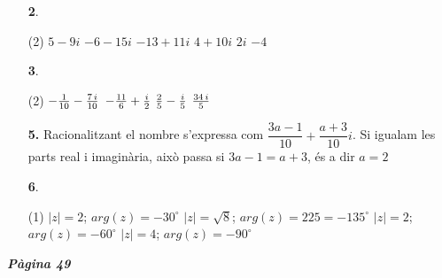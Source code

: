 \documentclass[a4paper, pdf, twoside]{book}
\begin{document}
\begin{multicols}{2}
\begin{enumerate}

 \item[\fontfamily{phv}\selectfont\color{blue}\textbf{2}. ]  \scalebox{0.6}{\simbolclau } 
 \begin{tasks}[column-sep=1em, item-indent=1.3333em](2)
	 \task  $5 -9i$
	 \task $-6-15i$
	 \task $-13+11i$
	 \task $4 + 10i$
	 \task $2i$
	 \task $-4$
\end{tasks}
 \end{enumerate}
\begin{enumerate}
\vspace{0.25cm}



 \item[\fontfamily{phv}\selectfont\color{blue}\textbf{3}. ]  \scalebox{0.6}{\simbolclau } 
 \begin{tasks}[column-sep=1em, item-indent=1.3333em](2)
	 \task*  $-{{1}\over {10}}-{{7\,i}\over {10}}$
	 \task* $-{{11}\over {6}}+{{i}\over {2}}$
	 \task* ${{2}\over {5}}-{{i}\over {5}}$
	 \task ${{34\,i}\over {5}}$
\end{tasks}
\vspace{0.25cm}
\item[\fontfamily{phv}\selectfont\color{blue}\textbf{5. }] 
Racionalitzant el nombre s'expressa com $\dfrac {3a-1}{10}+\dfrac {a+3}{10}i$. Si igualam les parts real i imaginària, això passa si $3a-1=a+3$, és a dir $a=2$
\vspace{0.25cm}



 \item[\fontfamily{phv}\selectfont\color{blue}\textbf{6}. ]  \scalebox{0.6}{\simbolclau } 
 \begin{tasks}[column-sep=1em, item-indent=1.3333em](1)
	 \task  $|z|=2$; $arg(z)=-30^\circ $
	 \task* $|z|=\sqrt {8}$; $arg(z)=225 = - 135^\circ $
	 \task $|z|=2$; $arg(z)=-60^\circ $
	 \task $|z|=4$; $arg(z)=-90^\circ $
\end{tasks}
 \end{enumerate}
\vspace{0.3cm}


{\textbf{\em Pàgina 49}} \hrulefill
\begin{enumerate}
\vspace{0.25cm}




\end{enumerate}
\end{multicols}
\end{document}
